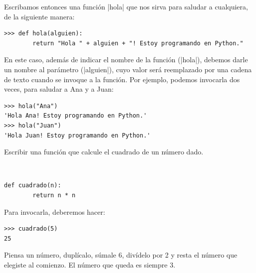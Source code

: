 Escribamos entonces una función |hola| que nos sirva para saludar a
cualquiera, de la siguiente manera:

\begin{lstlisting}[numbers=none]
>>> def hola(alguien):
        return "Hola " + alguien + "! Estoy programando en Python."
\end{lstlisting}

En este caso, además de indicar el nombre de la función (|hola|), debemos darle
un nombre al parámetro (|alguien|), cuyo valor será reemplazado por una cadena
de texto cuando se invoque a la función. Por ejemplo, podemos invocarla dos
veces, para saludar a Ana y a Juan:

\begin{lstlisting}[numbers=none]
>>> hola("Ana")
'Hola Ana! Estoy programando en Python.'
>>> hola("Juan")
'Hola Juan! Estoy programando en Python.'
\end{lstlisting}

\begin{problema}
\label{cuadrado}
Escribir una función que calcule el cuadrado de un número dado.
\end{problema}

\begin{solucion}
$ $\par
\begin{lstlisting}[numbers=none]
def cuadrado(n):
        return n * n
\end{lstlisting}

Para invocarla, deberemos hacer:
\begin{lstlisting}[numbers=none]
>>> cuadrado(5)
25
\end{lstlisting}
\end{solucion}

\begin{problema}
Piensa un número, duplícalo, súmale 6, divídelo por 2 y resta el número
que elegiste al comienzo. El número que queda es siempre 3.
\end{problema}

